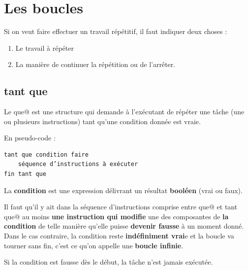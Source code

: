 \documentclass[11pt,a4paper]{article}
\begin{document}
            \section{Les boucles}
        Si on veut faire effectuer un travail r\'ep\'etitif, il faut indiquer deux choses :
        
					\begin{enumerate}
				
			\item Le travail \`a r\'ep\'eter
			\item La mani\`ere de continuer la r\'ep\'etition ou de l'arr\^eter.
					\end{enumerate}
				
            \par
        \subsection{tant que}
        Le \guillemotleft  \verb@tant que@ \guillemotright  est une structure 
        qui demande \`a l'ex\'ecutant de r\'ep\'eter une t\^ache (une ou
        plusieurs instructions) tant qu'une condition donn\'ee est vraie.
      
            \par
        En pseudo-code :
            \par
        \begin{verbatim}
tant que condition faire
    séquence d’instructions à exécuter
fin tant que
      \end{verbatim}
        La \textbf{condition} est une expression d\'elivrant un r\'esultat 
        \textbf{bool\'een} (vrai ou faux).
      
            \par
        
        Il faut qu'il y ait dans la s\'equence d'instructions comprise entre \verb@tant que@
        et \verb@fin tant que@ au moins \textbf{une instruction qui 
        modifie} une des composantes de \textbf{la condition}
        de telle mani\`ere qu'elle puisse \textbf{devenir fausse} \`a un moment donn\'e. Dans le cas contraire,
        la condition reste \textbf{ind\'efiniment vrai}e et la boucle va tourner sans fin, c'est ce qu'on appelle
        une \textbf{boucle infinie}.
      
            \par
        
        Si la condition est fausse d\`es le d\'ebut, la t\^ache n'est jamais ex\'ecut\'ee.
      
\end{document}
